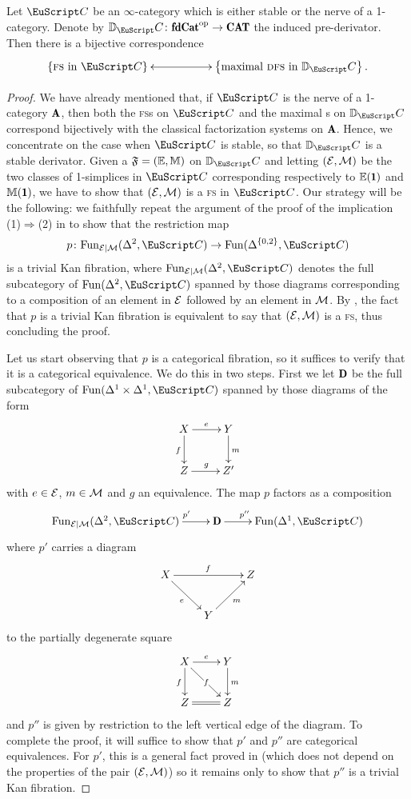 \begin{theorem}\label{infinity_FS_vs_CFS}
Let $\iC$ be an $\infty$-category which is either stable or the nerve of a 1-category. Denote by $\D_\iC\colon \fincat^\opp\to \Cat$ the induced pre-derivator. Then there is a bijective correspondence
\[
\xymatrix{
\left\{\text{\textsc{fs} in $\iC$}\right\}\ar@{<->}[rr]&&\left\{\text{maximal \dfs in $\D_\iC$}\right\}.
}
\]
\end{theorem}
\begin{proof}
We have already mentioned that, if $\iC$ is the nerve of a 1-category $\A$, then both the \textsc{fs}s on $\iC$ and the maximal {\dfs}s on $\D_\iC$ correspond bijectively with the classical factorization systems on $\A$. Hence, we concentrate on the case when $\iC$ is stable, so that $\D_\iC$ is a stable derivator. Given a \dfs $\mathfrak{F}=(\mathbb E,\mathbb M)$ on $\D_\iC$ and letting $(\mathcal{E},\mathcal{M})$ be the two classes of 1-simplices in $\iC$ corresponding respectively to $\mathbb E(\uno)$ and $\mathbb M(\uno)$, we have to show that $(\mathcal{E},\mathcal{M})$ is a \textsc{fs} in $\iC$. Our strategy will be the following: we faithfully repeat the argument of the proof of the implication (1)$\Rightarrow$(2) in \cite[\aprop \textbf{5.2.8.17}]{HTT} to show that the restriction map 
\[
p\colon \Fun_{\E|\M}(\Delta^2,\iC)\to \Fun(\Delta^{\{0,2\}},\iC)
\] 
is a trivial Kan fibration, where $\Fun_{\E|\M}(\Delta^2,\iC)$ denotes the full subcategory of $\Fun(\Delta^2,\iC)$ spanned by those diagrams 
corresponding to a composition of an element in $\mathcal{E}$ followed by an element in $\mathcal{M}$. By \cite[\emph{ibi}]{HTT}, the fact that $p$ is a trivial Kan fibration is equivalent to say that $(\mathcal{E},\mathcal{M})$ is a \textsc{fs}, thus concluding the proof.

Let us start observing that $p$ is a categorical fibration, so it suffices to verify that it is a  categorical equivalence. We do this in two steps. First we let $\sD$ be the full subcategory of $\Fun(\Delta^1\times \Delta^1,\iC)$ spanned by those diagrams of the form
\[\xymatrix{
X\ar[r]^e\ar[d]_f&Y\ar[d]^m\\
Z\ar[r]^g&Z'
}\]
with $e\in \mathcal{E}$, $m\in \mathcal{M}$ and $g$ an equivalence. The map $p$ factors as a composition
\[
\xymatrix{
\Fun_{\E|\M}(\Delta^2,\iC)\ar[r]^(.7){p'}&\sD\ar[r]^(.3){p''}& \Fun(\Delta^{1},\iC)
}
\] 
where $p'$ carries a diagram
\[
\xymatrix{
X\ar[rr]^f\ar[rd]_e&&Z\\
&Y\ar[ur]_m}
\]
to the partially degenerate square
\[\xymatrix{
X\ar[dr]|f\ar[r]^e\ar[d]_f&Y\ar[d]^m\\
Z\ar@{=}[r]&Z
}\]
and $p''$ is given by restriction to the left vertical edge of the diagram. To complete the proof, it will suffice to show that $p'$ and $p''$ are categorical equivalences. For $p'$, this is a general fact proved in \cite[\emph{ibi}]{HTT} (which does not depend on the properties of the pair $(\mathcal{E},\mathcal{M})$) so it remains only to show that $p''$ is a trivial Kan fibration.


\end{proof}
